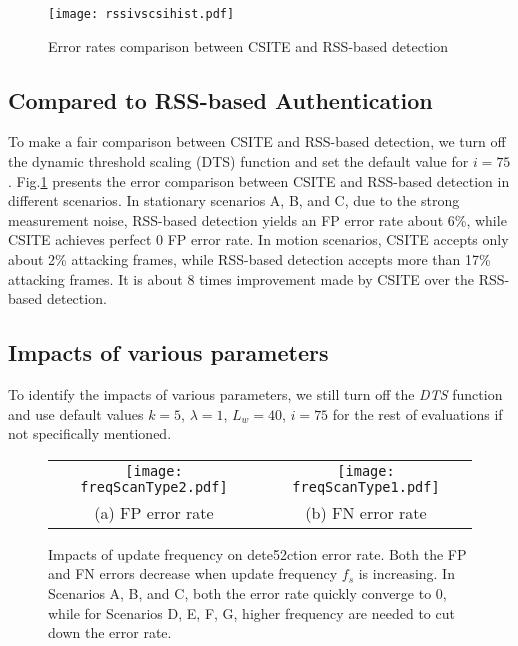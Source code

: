 \documentclass[conference]{IEEEtran}
\begin{document}
\begin{figure}[hptb]
\begin{center}
\texttt{[image: rssivscsihist.pdf]}
\end{center}
\caption{Error rates comparison between CSITE and RSS-based detection }
\label{fig:RSSvscsihist}
\vspace{-0.1in}
\end{figure}


\subsection{Compared to RSS-based Authentication}



To make a fair comparison between CSITE and RSS-based detection, we turn off the dynamic threshold scaling (DTS) function and set the default value for $i=75$. Fig.\ref{fig:RSSvscsihist} presents the error comparison between CSITE and RSS-based detection in different scenarios. In stationary scenarios A, B, and C, due to the strong measurement noise, RSS-based detection yields an FP error rate about 6\%, while  CSITE achieves perfect 0 FP error rate. In motion scenarios, CSITE accepts only about 2\% attacking frames, while RSS-based detection accepts more than 17\% attacking frames. It is about 8 times improvement made by CSITE over the RSS-based detection.


\subsection{Impacts of various parameters}
To identify the impacts of various parameters, we still turn off the \textit{DTS} function and use default values $k=5$, $\lambda=1$, $L_w=40$, $i=75$ for the rest of evaluations if not specifically mentioned.

\begin{figure*}
\begin{center}
\begin{tabular}{cc}
  \hspace{-0.1in}\texttt{[image: freqScanType2.pdf]}
   & \texttt{[image: freqScanType1.pdf]} \\
  (a) FP error rate & (b) FN error rate
\end{tabular}
\end{center}
\caption{Impacts of update frequency on dete52ction error rate. Both the FP and FN errors decrease when update frequency $f_s$ is increasing. In Scenarios A, B, and C, both the error rate quickly converge to $0$, while for Scenarios D, E, F, G, higher frequency are needed to cut down the error rate. }
\label{fig:freqScanExp}
\end{figure*}
\end{document}

